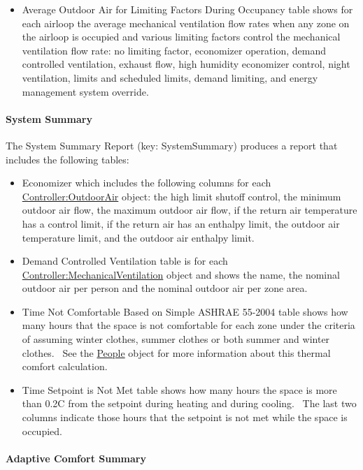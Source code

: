 \begin{itemize}
\item
  Average Outdoor Air for Limiting Factors During Occupancy table shows for each airloop the average mechanical ventilation flow rates when any zone on the airloop is occupied and various limiting factors control the mechanical ventilation flow rate: no limiting factor, economizer operation, demand controlled ventilation, exhaust flow, high humidity economizer control, night ventilation, limits and scheduled limits, demand limiting, and energy management system override.
\end{itemize}

\paragraph{System Summary}\label{system-summary}

The System Summary Report (key: SystemSummary) produces a report that includes the following tables:

\begin{itemize}
\item
  Economizer which includes the following columns for each \hyperref[controlleroutdoorair]{Controller:OutdoorAir} object: the high limit shutoff control, the minimum outdoor air flow, the maximum outdoor air flow, if the return air temperature has a control limit, if the return air has an enthalpy limit, the outdoor air temperature limit, and the outdoor air enthalpy limit.
\item
  Demand Controlled Ventilation table is for each \hyperref[controllermechanicalventilation]{Controller:MechanicalVentilation} object and shows the name, the nominal outdoor air per person and the nominal outdoor air per zone area.
\item
  Time Not Comfortable Based on Simple ASHRAE 55-2004 table shows how many hours that the space is not comfortable for each zone under the criteria of assuming winter clothes, summer clothes or both summer and winter clothes.~ See the \hyperref[people]{People} object for more information about this thermal comfort calculation.
\item
  Time Setpoint is Not Met table shows how many hours the space is more than 0.2C from the setpoint during heating and during cooling.~ The last two columns indicate those hours that the setpoint is not met while the space is occupied.
\end{itemize}

\paragraph{Adaptive Comfort Summary}\label{adaptive-comfort-summary}

